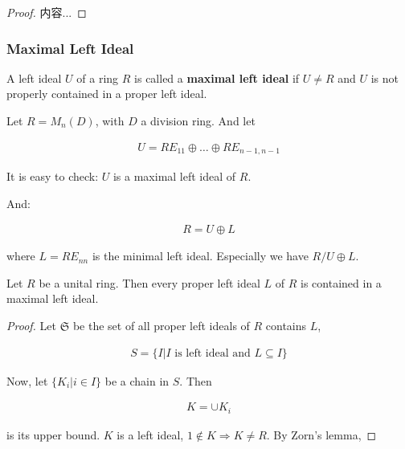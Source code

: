 \documentclass[Total.tex]{subfiles}
\begin{document}
	\begin{proof}
		内容...
	\end{proof}
	
	\subsubsection{Maximal Left Ideal}
	
	\begin{Def}
		A left ideal $U$ of a ring $R$ is called a \textbf{maximal left ideal} if $U\not=R$ and $U$ is not properly contained in a proper left ideal.
	\end{Def}
	
	\begin{example}
		Let $R=M_n(D)$, with $D$ a division ring. And let
		
		\begin{gather*}
			U=RE_{11}\oplus\dots\oplus RE_{n-1,n-1}
		\end{gather*}
		
		It is easy to check: $U$ is a maximal left ideal of $R$. 
		
		And:
		
		\begin{gather*}
			R=U\oplus L
		\end{gather*}
		
		where $L=RE_{nn}$ is the minimal left ideal. Especially we have $R/U\oplus L$. 
	\end{example}
	
	\begin{lemma}
		Let $R$ be a unital ring. Then every proper left ideal $L$ of $R$ is contained in a maximal left ideal. 
	\end{lemma}
	
	\begin{proof}
		Let $\mathfrak{S}$ be the set of all proper left ideals of $R$ contains $L$,
		
		\begin{gather*}
			S=\{I|I\mbox{ is left ideal and }L\subseteq I\}
		\end{gather*}
		
		Now, let $\{K_i|i\in I\}$ be a chain in $S$. Then
		
		\begin{gather*}
			K=\cup K_i
		\end{gather*}
		
		is its upper bound. $K$ is a left ideal, $1\notin K\Rightarrow K\not=R$. By Zorn's lemma,
	\end{proof}
	
\end{document}

